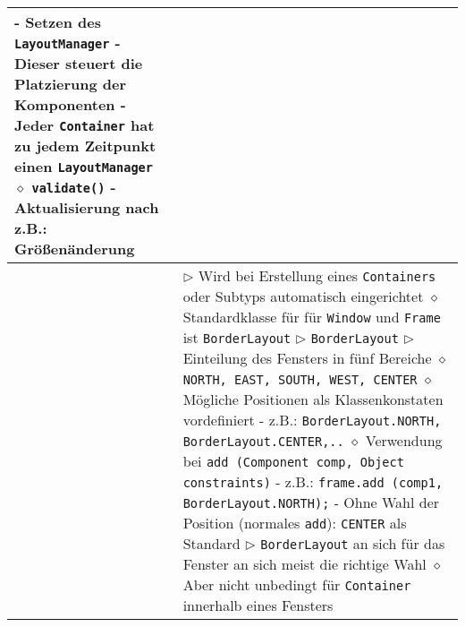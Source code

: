 \begin{longtable}{ | p{} p{} | }
{	\hspace{0.6cm} - Setzen des \texttt{LayoutManager} \\
	\hspace{0.6cm} - Dieser steuert die Platzierung der Komponenten \\ 
	\hspace{0.6cm} - Jeder \texttt{Container} hat zu jedem Zeitpunkt einen \texttt{LayoutManager} \\
	\hspace{0.4cm} $\diamond$ \texttt{validate()} \\
	\hspace{0.6cm} - Aktualisierung nach z.B.: Grö\ss enänderung } \\ \hline

	\makecell[l]{Klasse LayoutManager} & \makecell[l]{
	$\rhd$ Wird bei Erstellung eines \texttt{Containers} oder Subtyps automatisch eingerichtet \\
	\hspace{0.4cm} $\diamond$ Standardklasse für für \texttt{Window} und \texttt{Frame} ist \texttt{BorderLayout} \\
	$\rhd$ \texttt{BorderLayout} \\
	$\rhd$ Einteilung des Fensters in fünf Bereiche \\
	\hspace{0.4cm} $\diamond$ \texttt{NORTH, EAST, SOUTH, WEST, CENTER} \\
	\hspace{0.4cm} $\diamond$ Mögliche Positionen als Klassenkonstaten vordefiniert \\
	\hspace{0.6cm} - z.B.: \texttt{BorderLayout.NORTH, BorderLayout.CENTER,..} \\
	\hspace{0.4cm} $\diamond$ Verwendung bei \texttt{add (Component comp, Object constraints)} \\
	\hspace{0.6cm} - z.B.: \texttt{frame.add (comp1, BorderLayout.NORTH);} \\
	\hspace{0.6cm} - Ohne Wahl der Position (normales \texttt{add}): \texttt{CENTER} als Standard \\
	$\rhd$ \texttt{BorderLayout} an sich für das Fenster an sich meist die richtige Wahl \\
	\hspace{0.4cm} $\diamond$ Aber nicht unbedingt für \texttt{Container} innerhalb eines Fensters \\
}
\end{longtable}

